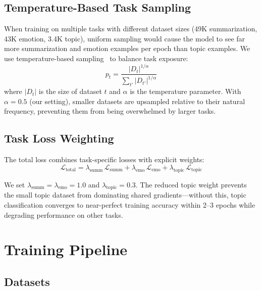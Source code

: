 \documentclass[11pt,a4paper]{article}
\begin{document}
\subsection{Temperature-Based Task Sampling}

When training on multiple tasks with different dataset sizes (49K summarization, 43K emotion, 3.4K topic), uniform sampling would cause the model to see far more summarization and emotion examples per epoch than topic examples.
We use temperature-based sampling~\citep{arivazhagan2019massively} to balance task exposure:
\begin{equation}
    p_t = \frac{|D_t|^{1/\alpha}}{\sum_{t'} |D_{t'}|^{1/\alpha}}
\end{equation}
where $|D_t|$ is the size of dataset $t$ and $\alpha$ is the temperature parameter.
With $\alpha = 0.5$ (our setting), smaller datasets are upsampled relative to their natural frequency, preventing them from being overwhelmed by larger tasks.

\subsection{Task Loss Weighting}

The total loss combines task-specific losses with explicit weights:
\begin{equation}
    \mathcal{L}_\text{total} = \lambda_\text{summ}\,\mathcal{L}_\text{summ} + \lambda_\text{emo}\,\mathcal{L}_\text{emo} + \lambda_\text{topic}\,\mathcal{L}_\text{topic}
\end{equation}

We set $\lambda_\text{summ} = \lambda_\text{emo} = 1.0$ and $\lambda_\text{topic} = 0.3$.
The reduced topic weight prevents the small topic dataset from dominating shared gradients---without this, topic classification converges to near-perfect training accuracy within 2--3 epochs while degrading performance on other tasks.

\section{Training Pipeline}
\label{sec:training}

\subsection{Datasets}
\label{sec:datasets}
\end{document}
